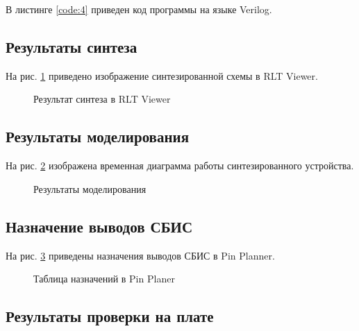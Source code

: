 В листинге \ref{code:4} приведен код программы на языке Verilog.

%

\subsection{Результаты синтеза}

На рис. \ref{fig:lab3_4_rtl} приведено изображение синтезированной схемы в RLT Viewer.

\begin{figure}[H]
\begin{center}
	\caption{Результат синтеза в RLT Viewer}
	\label{fig:lab3_4_rtl}
\end{center}
\end{figure}

\subsection{Результаты моделирования}
\label{sec:lab3_4_modeling}

На рис. \ref{fig:lab3_4_modeling} изображена временная диаграмма работы синтезированного устройства.

\begin{figure}[H]
\begin{center}
	\caption{Результаты моделирования}
	\label{fig:lab3_4_modeling}
\end{center}
\end{figure}

\subsection{Назначение выводов СБИС}

На рис. \ref{fig:lab3_4_pins} приведены назначения выводов СБИС в Pin Planner.

\begin{figure}[H]
\begin{center}
	\caption{Таблица назначений в Pin Planer}
	\label{fig:lab3_4_pins}
\end{center}
\end{figure}

\subsection{Результаты проверки на плате}

